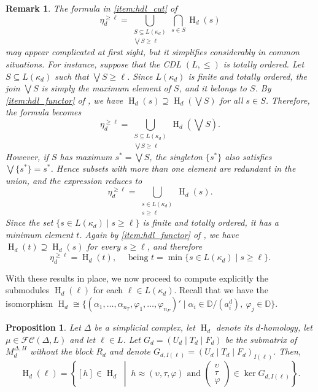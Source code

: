 \documentclass[a4paper,10pt]{article}
\newtheorem{proposition}[theorem]{Proposition}
\newtheorem{remark}[theorem]{Remark}
\newcommand{\bbd}{\mathbb{D}}
\newcommand{\calfc}{\mathcal{FC}}
\DeclareMathOperator{\Ho}{H}
\begin{document}
\begin{remark}
The formula in \cref{item:hdl_cut} of 
\[
\eta_d^{\geq \ell}
= \bigcup_{\substack{S \subseteq L(\kappa_d) \\ \bigvee S \geq \ell}}
\bigcap_{s \in S} \Ho_d(s)
\]
may appear complicated at first sight, but it simplifies considerably in common situations. 
For instance, suppose that the CDL \((L,\leq)\) is totally ordered. Let \(S \subseteq L(\kappa_d)\) such that \(\bigvee S \geq \ell\). 
Since \(L(\kappa_d)\) is finite and totally ordered, the join \(\bigvee S\) is simply the maximum element of \(S\), and it belongs to \(S\).
By \cref{item:hdl_functor} of , we have \(\Ho_d(s) \supseteq \Ho_d(\bigvee S)\) for all \(s \in S\). 
Therefore, the formula becomes
\[
\eta_d^{\geq \ell}
= \bigcup_{\substack{S \subseteq L(\kappa_d) \\ \bigvee S \geq \ell}}
\Ho_d \left(\bigvee S\right).
\]
However, if \(S\) has maximum \(s^*=\bigvee S\), the singleton \(\{s^*\}\) also satisfies 
\(\bigvee\{s^*\}=s^*\). Hence subsets with more than one element are redundant in the union, and the expression reduces to
\[
\eta_d^{\geq \ell}
= \bigcup_{\substack{s \in L(\kappa_d) \\ s \geq \ell}} \Ho_d(s).
\]
Since the set \(\{s \in L(\kappa_d)\mid s \geq \ell\}\) is finite and totally ordered, it has a minimum element \(t\). Again by \cref{item:hdl_functor} of , we have \(\Ho_d(t) \supseteq \Ho_d(s)\) for every \(s \geq \ell\), and therefore
\[
\eta_d^{\geq \ell}=\Ho_d(t),
\quad \text{ being }
t=\min\{s \in L(\kappa_d)\mid s \geq \ell\}.
\]
\end{remark}

With these results in place, we now proceed to compute explicitly the submodules \(\Ho_d(\ell)\) for each \(\ell \in L(\kappa_d)\). Recall that we have the isomorphism \(\Ho_d \cong 
\{(\alpha_{1},\dots,\alpha_{n_T},\varphi_{1},\dots,\varphi_{n_F})' 
\mid \alpha_{i} \in \bbd/(a^{d}_{i}),\ \varphi_{j} \in \bbd\}\).

\begin{proposition}
\label{prop:hdl_projection}
Let \(\Delta\) be a simplicial complex, let \(\Ho_d\) denote its \(d\)-homology, let \(\mu \in \calfc(\Delta,L)\) and let \(\ell \in L\). Let \(G_d=(U_d \mid T_d \mid F_d)\) be the submatrix of \(M_d^{\Delta,H}\) without the block \(R_d\) and denote \(G_{d,I(\ell)} = (U_d \mid T_d \mid F_d)_{I(\ell)}\). Then,
\[
\Ho_d(\ell)= 
\left\{ 
[h] \in \Ho_d \; \middle | \;
h \approx (\upsilon,\tau,\varphi) \text{  and  }
\left(\begin{array}{c}\upsilon \\ \tau \\ \varphi \end{array}\right) \in \ker G_{d,I(\ell)}
\right\}.
\]
\end{proposition}
\end{document}
